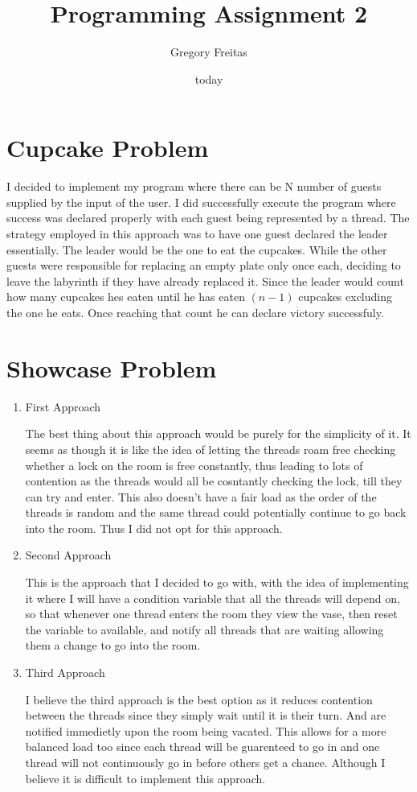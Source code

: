 \documentclass[12pt]{article}
\begin{document}
\title{Programming Assignment 2}
\author{Gregory Freitas}
\date{today}
\maketitle

\section{Cupcake Problem}
\indent I decided to implement my program where there can be N number of guests supplied by the input of the user.
I did successfully execute the program where success was declared properly with each guest being represented by a thread. 
The strategy employed in this approach was to have one guest declared the leader essentially. The leader would be the one to eat the cupcakes. 
While the other guests were responsible for replacing an empty plate only once each, deciding to leave the labyrinth if they have already replaced it. 
Since the leader would count how many cupcakes hes eaten until he has eaten $(n-1)$ cupcakes excluding the one he eats. 
Once reaching that count he can declare victory successfuly. 

\section{Showcase Problem}
    \begin{enumerate}
        \item First Approach
        
        The best thing about this approach would be purely for the simplicity of it. It seems as though it is like the idea of
        letting the threads roam free checking whether a lock on the room is free constantly, thus leading to lots of contention
        as the threads would all be cosntantly checking the lock, till they can try and enter. This also doesn't have a fair load
        as the order of the threads is random and the same thread could potentially continue to go back into the room. Thus I did not
        opt for this approach.
        \item Second Approach
        
        This is the approach that I decided to go with, with the idea of implementing it where I will have a condition variable that
        all the threads will depend on, so that whenever one thread enters the room they view the vase, then reset the variable to
        available, and notify all threads that are waiting allowing them a change to go into the room.
        \item Third Approach
        
        I believe the third approach is the best option as it reduces contention between the threads since they simply wait
        until it is their turn. And are notified immedietly upon the room being vacated. This allows for a more balanced load
        too since each thread will be guarenteed to go in and one thread will not continuously go in before others get a chance.
        Although I believe it is difficult to implement this approach.
    \end{enumerate}
\end{document}
